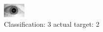 \begin{figure}[h!]
\begin{center}
\includegraphics[width=0.60\columnwidth]{figures/ID1664_class_3_target_2.png}
\end{center}
\caption{ Classification: 3 actual target: 2}
\label{fig:ID1664_class_3_target_2}
\end{figure}
